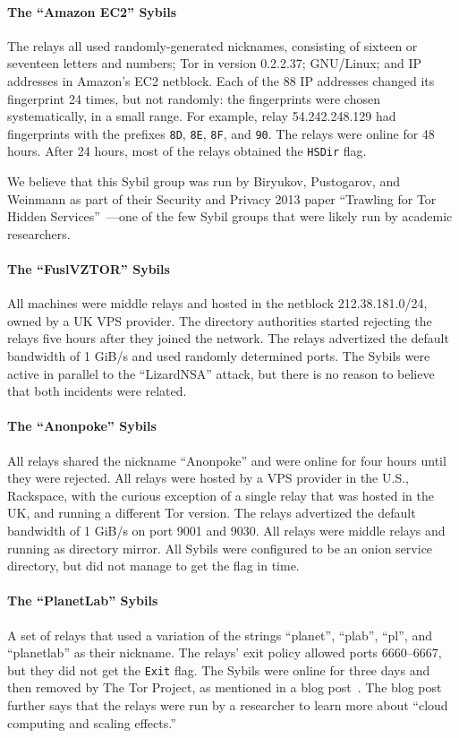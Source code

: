 \paragraph{The ``Amazon EC2'' Sybils}
The relays all used randomly-generated nicknames, consisting of sixteen or
seventeen letters and numbers; Tor in version 0.2.2.37; GNU/Linux; and IP
addresses in Amazon's EC2 netblock.  Each of the 88 IP addresses changed its
fingerprint 24 times, but not randomly: the fingerprints were chosen
systematically, in a small range.  For example, relay 54.242.248.129 had
fingerprints with the prefixes \texttt{8D}, \texttt{8E}, \texttt{8F}, and
\texttt{90}.  The relays were online for 48 hours.  After 24 hours, most of the
relays obtained the \texttt{HSDir} flag.

We believe that this Sybil group was run by Biryukov, Pustogarov, and Weinmann
as part of their Security and Privacy 2013 paper ``Trawling for Tor Hidden
Services''~\cite{Biryukov2013a}---one of the few Sybil groups that were likely
run by academic researchers.

\paragraph{The ``FuslVZTOR'' Sybils}
All machines were middle relays and hosted in the netblock 212.38.181.0/24,
owned by a UK VPS provider.  The directory authorities started rejecting the
relays five hours after they joined the network.  The relays advertized the
default bandwidth of 1 GiB/s and used randomly determined ports.  The Sybils
were active in parallel to the ``LizardNSA'' attack, but there is no reason to
believe that both incidents were related.

\paragraph{The ``Anonpoke'' Sybils}
All relays shared the nickname ``Anonpoke'' and were online for four hours until
they were rejected.  All relays were hosted by a VPS provider in the U.S.,
Rackspace, with the curious exception of a single relay that was hosted in the
UK, and running a different Tor version.  The relays advertized the default
bandwidth of 1 GiB/s on port 9001 and 9030.  All relays were middle relays and
running as directory mirror.  All Sybils were configured to be an onion service
directory, but did not manage to get the flag in time.

\paragraph{The ``PlanetLab'' Sybils}
A set of relays that used a variation of the strings ``planet'', ``plab'',
``pl'', and ``planetlab'' as their nickname.  The relays' exit policy allowed
ports 6660--6667, but they did not get the \texttt{Exit} flag.  The Sybils were
online for three days and then removed by The Tor Project, as mentioned in a
blog post~\cite{progressreport}.  The blog post further says that the relays
were run by a researcher to learn more about ``cloud computing and scaling
effects.''

